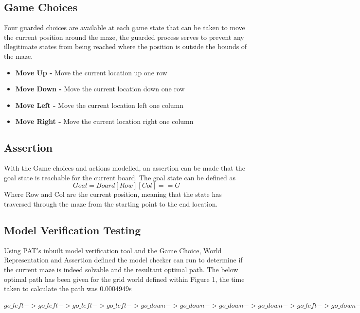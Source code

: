 \documentclass[twoside, 12pt, a4paper]{article}
\begin{document}
\subsection{Game Choices}
Four guarded choices are available at each game state that can be taken to move the current position around the maze, the guarded process serves to prevent any illegitimate states from being reached where the position is outside the bounds of the maze. \\
\begin{itemize}
 \item \textbf{Move Up -} Move the current location up one row
 \item \textbf{Move Down -} Move the current location down one row
 \item \textbf{Move Left -} Move the current location left one column
 \item \textbf{Move Right -} Move the current location right one column
\end{itemize}
\subsection{Assertion}
With the Game choices and actions modelled, an assertion can be made that the goal state is reachable for the current board. The goal state can be defined as \\
\begin{equation}
Goal = Board[Row][Col] == G
\end{equation}
Where Row and Col are the current position, meaning that the state has traversed through the maze from the starting point to the end location.
\subsection{Model Verification Testing}
Using PAT's inbuilt model verification tool and the Game Choice, World Representation and Assertion defined the model checker can run to determine if the current maze is indeed solvable and the resultant optimal path. The below optimal path has been given for the grid world defined within Figure 1, the time taken to calculate the path was 0.0004949s\\
\begin{center}
\begin{math}
go\_left -> go\_left -> go\_left -> go\_left -> go\_down -> go\_down -> go\_down -> go\_down -> go\_left -> go\_down -> go\_left -> go\_left -> go\_down -> go\_down -> go\_right -> go\_right -> go\_right -> go\_right -> go\_right -> go\_right
\end{math}
\end{center}
\end{document}

